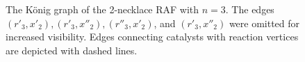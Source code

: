 \documentclass[pdflatex]{sn-jnl}
\theoremstyle{thmstyleone}%
\theoremstyle{examplesty}%
\theoremstyle{thmstylethree}%
\begin{document}
\begin{figure}
	\caption{The K\"onig graph of the 2-necklace RAF with $n=3$. 
	The edges $(r'_3, x'_2), (r'_3, x''_2), (r''_3, x'_2)$, and $(r'_3, x''_2)$ were omitted for increased visibility. 
	Edges connecting catalysts with reaction vertices are depicted with dashed lines.}
	\label{fig:NecklaceRAF}
\end{figure}
\end{document}
